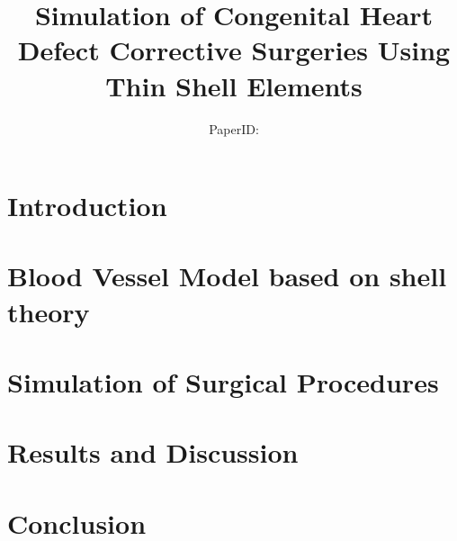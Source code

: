 \documentclass[runningheads,a4paper]{llncs}
\begin{document}
\mainmatter            %

\title{Simulation of Congenital Heart Defect Corrective Surgeries Using Thin Shell Elements}

\author{PaperID:} %

\maketitle

\begin{abstract}
\end{abstract}

\section{Introduction}
 

\section{Blood Vessel Model based on shell theory}


\section{Simulation of Surgical Procedures}
\label{sec-method}


\section{Results and Discussion}


\section{Conclusion}

\end{document}
